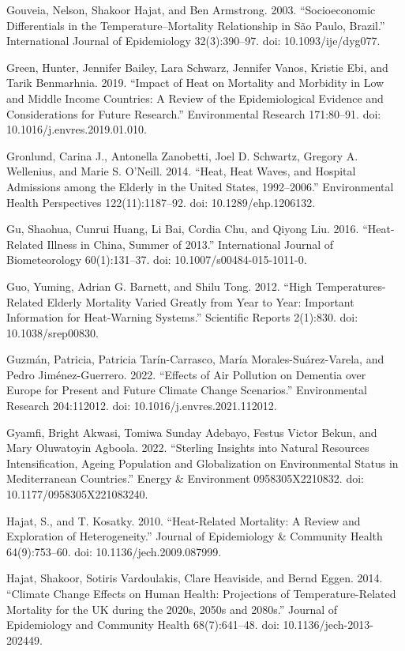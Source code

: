 \documentclass[12pt]{article}
\begin{document}
Gouveia, Nelson, Shakoor Hajat, and Ben Armstrong. 2003. ``Socioeconomic
Differentials in the Temperature--Mortality Relationship in São Paulo,
Brazil.'' International Journal of Epidemiology 32(3):390--97. doi:
10.1093/ije/dyg077.

Green, Hunter, Jennifer Bailey, Lara Schwarz, Jennifer Vanos, Kristie
Ebi, and Tarik Benmarhnia. 2019. ``Impact of Heat on Mortality and
Morbidity in Low and Middle Income Countries: A Review of the
Epidemiological Evidence and Considerations for Future Research.''
Environmental Research 171:80--91. doi: 10.1016/j.envres.2019.01.010.

Gronlund, Carina J., Antonella Zanobetti, Joel D. Schwartz, Gregory A.
Wellenius, and Marie S. O'Neill. 2014. ``Heat, Heat Waves, and Hospital
Admissions among the Elderly in the United States, 1992--2006.''
Environmental Health Perspectives 122(11):1187--92. doi:
10.1289/ehp.1206132.

Gu, Shaohua, Cunrui Huang, Li Bai, Cordia Chu, and Qiyong Liu. 2016.
``Heat-Related Illness in China, Summer of 2013.'' International Journal
of Biometeorology 60(1):131--37. doi: 10.1007/s00484-015-1011-0.

Guo, Yuming, Adrian G. Barnett, and Shilu Tong. 2012. ``High
Temperatures-Related Elderly Mortality Varied Greatly from Year to Year:
Important Information for Heat-Warning Systems.'' Scientific Reports
2(1):830. doi: 10.1038/srep00830.

Guzmán, Patricia, Patricia Tarín-Carrasco, María Morales-Suárez-Varela,
and Pedro Jiménez-Guerrero. 2022. ``Effects of Air Pollution on Dementia
over Europe for Present and Future Climate Change Scenarios.''
Environmental Research 204:112012. doi: 10.1016/j.envres.2021.112012.

Gyamfi, Bright Akwasi, Tomiwa Sunday Adebayo, Festus Victor Bekun, and
Mary Oluwatoyin Agboola. 2022. ``Sterling Insights into Natural
Resources Intensification, Ageing Population and Globalization on
Environmental Status in Mediterranean Countries.'' Energy \& Environment
0958305X2210832. doi: 10.1177/0958305X221083240.

Hajat, S., and T. Kosatky. 2010. ``Heat-Related Mortality: A Review and
Exploration of Heterogeneity.'' Journal of Epidemiology \& Community
Health 64(9):753--60. doi: 10.1136/jech.2009.087999.

Hajat, Shakoor, Sotiris Vardoulakis, Clare Heaviside, and Bernd Eggen.
2014. ``Climate Change Effects on Human Health: Projections of
Temperature-Related Mortality for the UK during the 2020s, 2050s and
2080s.'' Journal of Epidemiology and Community Health 68(7):641--48.
doi: 10.1136/jech-2013-202449.
\end{document}
